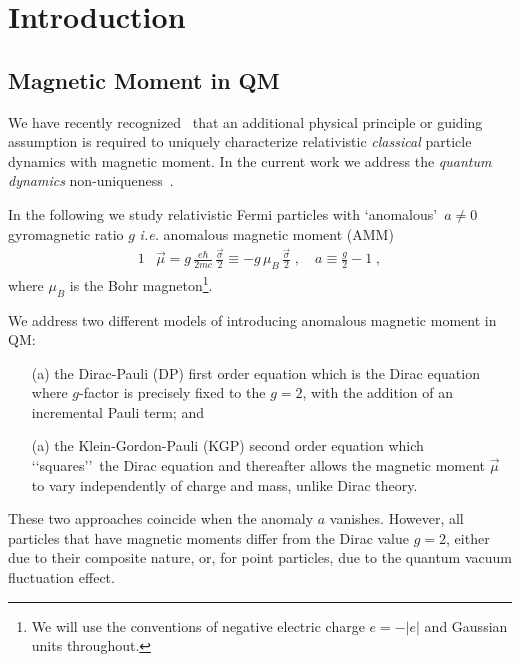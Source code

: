 \documentclass[epj]{svjour}
\begin{document}
\section{Introduction} \label{pre_intro}

\subsection{Magnetic Moment in QM} \label{intro}
We have recently recognized~\cite{Rafelski:2017hce} that an additional physical principle or guiding assumption is required to uniquely characterize relativistic {\em classical} particle dynamics with magnetic moment. In the current work we address the {\em quantum dynamics} non-uniqueness~\cite{Brown:1958zz,Veltman:1997am}.

In the following we study relativistic Fermi particles with \lq anomalous\rq\ $a\ne 0$ gyromagnetic ratio $g$ {\it i.e.\/} anomalous magnetic moment (AMM) 
\begin{alignat}{1}
\label{intro01} &\vec{\mu}={g}\,\frac{e\hbar}{2mc}\,\frac{\vec{\sigma}}{2}
\equiv-g\,\mu_{B}\,\frac{\vec{\sigma}}{2}\;,
\quad a\equiv \frac g 2-1\;,
\end{alignat}
where $\mu_{B}$ is the Bohr magneton\footnote[1]{We will use the conventions of negative electric charge $e=-|e|$ and Gaussian units throughout.}.

We address two different models of introducing anomalous magnetic moment in QM: 
\begin{enumerate}%
\item[(a)] the Dirac-Pauli (DP) first order equation which is the Dirac equation where $g$-factor is precisely fixed to the $g=2$, with the addition of an incremental Pauli term; and
\item[(a)] the Klein-Gordon-Pauli (KGP) second order equation which \lq\lq squares\rq\rq\ the Dirac equation and thereafter allows the magnetic moment $\vec{\mu}$ to vary independently of charge and mass, unlike Dirac theory.
\end{enumerate} 
These two approaches coincide when the anomaly $a$ vanishes. However, all particles that have magnetic moments differ from the Dirac value $g=2$, either due to their composite nature, or, for point particles, due to the quantum vacuum fluctuation effect.
\end{document}

